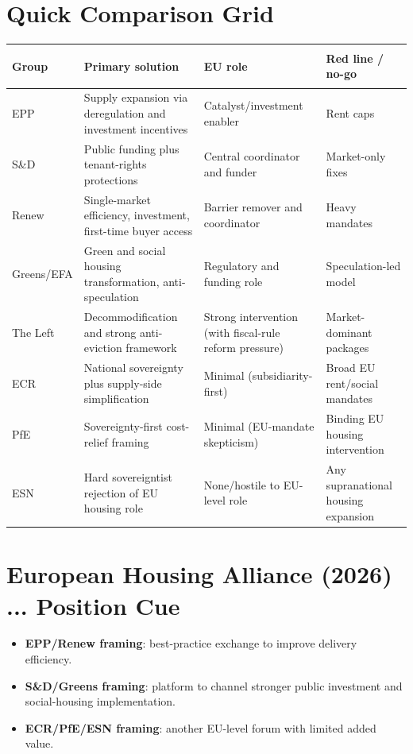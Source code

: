 \documentclass[10pt,a4paper]{article}
\begin{document}
\section*{\color{eublue}Quick Comparison Grid}
\small
\renewcommand{\arraystretch}{1.1}
\begin{tabularx}{\textwidth}{>{\bfseries\raggedright\arraybackslash}p{2.2cm} >{\raggedright\arraybackslash}X >{\raggedright\arraybackslash}p{3.1cm} >{\raggedright\arraybackslash}p{3.2cm}}
\toprule
Group & Primary solution & EU role & Red line / no-go \\
\midrule
EPP & Supply expansion via deregulation and investment incentives & Catalyst/investment enabler & Rent caps \\
\midrule
S\&D & Public funding plus tenant-rights protections & Central coordinator and funder & Market-only fixes \\
\midrule
Renew & Single-market efficiency, investment, first-time buyer access & Barrier remover and coordinator & Heavy mandates \\
\midrule
Greens/EFA & Green and social housing transformation, anti-speculation & Regulatory and funding role & Speculation-led model \\
\midrule
The Left & Decommodification and strong anti-eviction framework & Strong intervention (with fiscal-rule reform pressure) & Market-dominant packages \\
\midrule
ECR & National sovereignty plus supply-side simplification & Minimal (subsidiarity-first) & Broad EU rent/social mandates \\
\midrule
PfE & Sovereignty-first cost-relief framing & Minimal (EU-mandate skepticism) & Binding EU housing intervention \\
\midrule
ESN & Hard sovereigntist rejection of EU housing role & None/hostile to EU-level role & Any supranational housing expansion \\
\bottomrule
\end{tabularx}
\normalsize

\vspace{0.4em}
\section*{\color{eublue}European Housing Alliance (2026) ... Position Cue}
\begin{itemize}
\item \textbf{EPP/Renew framing}: best-practice exchange to improve delivery efficiency.
\item \textbf{S\&D/Greens framing}: platform to channel stronger public investment and social-housing implementation.
\item \textbf{ECR/PfE/ESN framing}: another EU-level forum with limited added value.
\end{itemize}
\end{document}
